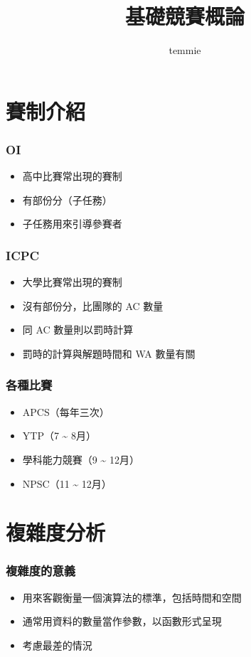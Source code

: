 \documentclass{beamer}
\title{基礎競賽概論}
\author{temmie}
\date{}
\begin{document}
\begin{frame}
    \titlepage
\end{frame}

\begin{frame}
    \tableofcontents
\end{frame}

\section{賽制介紹}

\begin{frame}
    \frametitle{OI}
    \begin{itemize}
        \item 高中比賽常出現的賽制
        \item 有部份分（子任務）
        \item 子任務用來引導參賽者
    \end{itemize}
\end{frame}

\begin{frame}
    \frametitle{ICPC}
    \begin{itemize}
        \item 大學比賽常出現的賽制
        \item 沒有部份分，比團隊的 AC 數量
        \item<2-> 同 AC 數量則以罰時計算
        \item<2-> 罰時的計算與解題時間和 WA 數量有關
    \end{itemize}
\end{frame}

\begin{frame}
    \frametitle{各種比賽}
    \begin{itemize}
        \item APCS（每年三次）
        \item YTP（7 \~{} 8月）
        \item 學科能力競賽（9 \~{} 12月）
        \item NPSC（11 \~{} 12月）
    \end{itemize}
\end{frame}

\section{複雜度分析}

\begin{frame}
    \frametitle{複雜度的意義}
    \begin{itemize}
        \item 用來客觀衡量一個演算法的標準，包括時間和空間
        \item 通常用資料的數量當作參數，以函數形式呈現
        \item 考慮最差的情況
    \end{itemize}
\end{frame}
\end{document}
